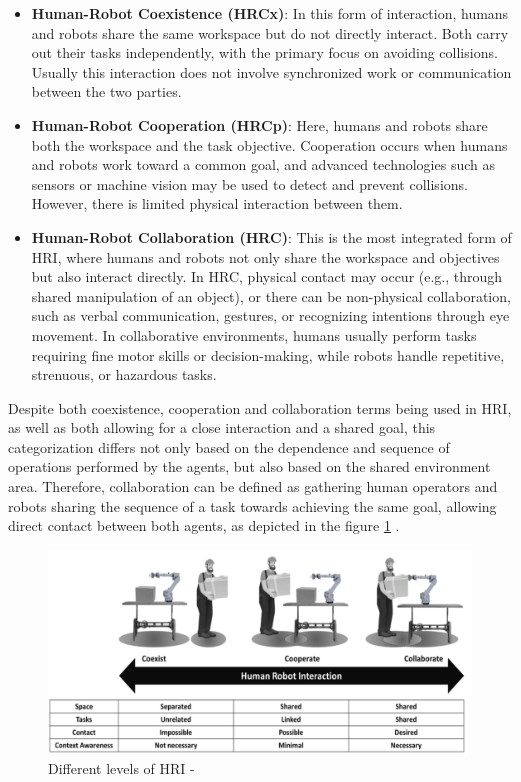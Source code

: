 \begin{itemize}
    \item \textbf{Human-Robot Coexistence (HRCx)}: In this form of interaction, humans and robots share the same workspace but do not directly interact.
    Both carry out their tasks independently, with the primary focus on avoiding collisions. Usually this interaction does not involve synchronized work 
    or communication between the two parties.

    \item \textbf{Human-Robot Cooperation (HRCp)}: Here, humans and robots share both the workspace and the task objective. Cooperation occurs when humans
    and robots work toward a common goal, and advanced technologies such as sensors or machine vision may be used to detect and prevent collisions.
    However, there is limited physical interaction between them.

    \item \textbf{Human-Robot Collaboration (HRC)}: This is the most integrated form of \ac{HRI}, where humans and robots not only share the workspace and
    objectives but also interact directly. In HRC, physical contact may occur (e.g., through shared manipulation of an object), or there can be non-physical
    collaboration, such as verbal communication, gestures, or recognizing intentions through eye movement. In collaborative environments, humans usually
    perform tasks requiring fine motor skills or decision-making, while robots handle repetitive, strenuous, or hazardous tasks.
\end{itemize}

Despite both coexistence, cooperation and collaboration terms being used in \ac{HRI}, as well as both allowing for a close interaction and a 
shared goal, this categorization differs not only based on the dependence and sequence of operations performed by the agents, but also based on 
the shared environment area. Therefore, collaboration can be defined as gathering human operators and robots sharing the sequence of a task towards 
achieving the same goal, allowing direct contact between both agents, as depicted in the figure \ref{fig:collab} \cite{Jahanmahin2022}.


\begin{figure}[h]
    \centering
    \hspace{-1.3cm}
    \includegraphics[width=1.07\linewidth]{figs/collab-coex-coopr.png}
    \caption{Different levels of \ac{HRI} - \cite{Jahanmahin2022}} 
    \label{fig:collab}
\end{figure} 


